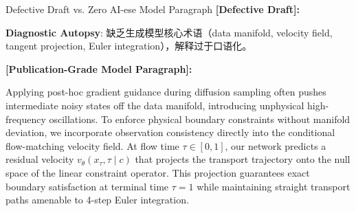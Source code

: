 \begin{ExampleBox}{Defective Draft vs. Zero AI-ese Model Paragraph}
\textbf{\color{TargetHighlight}[Defective Draft]:}\par
{}\par\vspace{4pt}
\textbf{Diagnostic Autopsy}: 缺乏生成模型核心术语（data manifold, velocity field, tangent projection, Euler integration），解释过于口语化。\par\vspace{6pt}
\textbf{\color{AcadNavy}[Publication-Grade Model Paragraph]:}\par
Applying post-hoc gradient guidance during diffusion sampling often pushes intermediate noisy states off the data manifold, introducing unphysical high-frequency oscillations. To enforce physical boundary constraints without manifold deviation, we incorporate observation consistency directly into the conditional flow-matching velocity field. At flow time $\tau \in [0, 1]$, our network predicts a residual velocity $v_\theta(x_\tau, \tau \mid c)$ that projects the transport trajectory onto the null space of the linear constraint operator. This projection guarantees exact boundary satisfaction at terminal time $\tau=1$ while maintaining straight transport paths amenable to 4-step Euler integration.
\end{ExampleBox}
